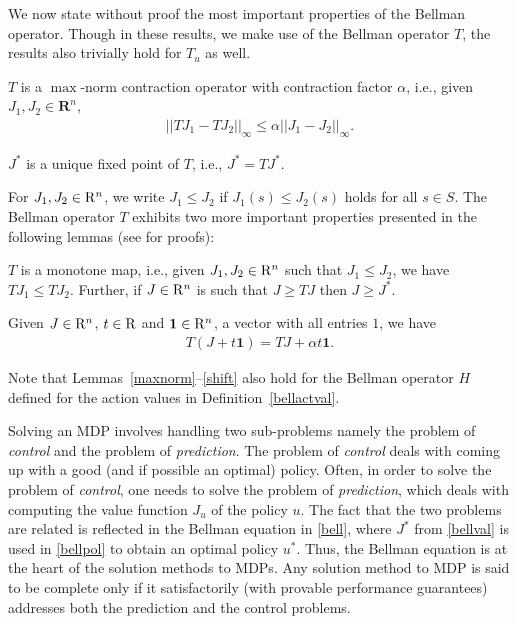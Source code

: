 We now state without proof the most important properties of the Bellman operator. 
Though in these results, we make use of the Bellman operator $T$, the results also trivially hold for $T_u$ as well.

\begin{lemma}\label{maxnorm}
$T$ is a $\max$-norm contraction operator with contraction factor $\alpha$, i.e., given $J_1, J_2 \in \mathbf{R}^n$,
\begin{align}
||TJ_1-TJ_2||_\infty\leq \alpha ||J_1-J_2||_\infty.
\end{align}
\end{lemma}
\begin{lemma}\label{uniquesol} 
$J^*$ is a unique fixed point of $T$, i.e., $J^*=TJ^*$.
\end{lemma}
For $J_1,J_2\in \mathrm{R}^n$, we write $J_1\le J_2$ if $J_1(s)\le J_2(s)$ holds for all $s\in S$.
The Bellman operator $T$ exhibits two more important properties presented in the following lemmas (see \cite{BertB} for proofs):
\begin{lemma}\label{monotone}
$T$ is a monotone map, i.e., given $J_1,J_2 \in \mathrm{R}^n$ such that $J_1\leq J_2$, we have $T J_1\leq T J_2$. 
Further, if $J\in \mathrm{R}^n$ is such that $J\geq TJ$ then $J\geq J^*$.
\end{lemma}
\begin{lemma}\label{shift}
Given $J\in \mathrm{R}^n$, $t \in \mathrm{R}$ and $\mathbf{1} \in \mathrm{R}^n$, a vector with all entries $1$, we have
\begin{align}
T(J+t\mathbf{1})=TJ+\alpha t\mathbf{1}.
\end{align}
\end{lemma}
Note that Lemmas~\ref{maxnorm}--\ref{shift} also hold for the Bellman operator $H$ defined for the action values in Definition~\ref{bellactval}.\par
Solving an MDP involves handling two sub-problems namely the problem of \emph{control} and the problem of \emph{prediction}. The problem of \emph{control} deals with coming up with a good (and if possible an optimal) policy. Often, in order to solve the problem of \emph{control}, one needs to solve the problem of \emph{prediction}, which deals with computing the value function $J_u$ of the policy $u$. The fact that the two problems are related is reflected in the Bellman equation in \eqref{bell}, where $J^*$ from \eqref{bellval} is used in \eqref{bellpol} to obtain an optimal policy $u^*$. Thus, the Bellman equation is at the heart of the solution methods to MDPs. Any solution method to MDP is said to be complete only if it satisfactorily (with provable performance guarantees) addresses both the prediction and the control problems. 

